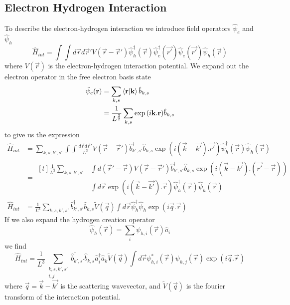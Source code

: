 \subsection{Electron Hydrogen Interaction}
To describe the electron-hydrogen
interaction we introduce field
operators \(\hat{\psi}_e\) and
\(\hat{\psi}_h\)~\cite{nazarov_danon_2013}
\begin{equation}
    \hat{H}_{int} = \int\int{d\vec{r} d\vec{r}'
        V(\vec{r}-\vec{r}')
        \hat{\psi}^\dagger_h(\vec{r})
        \hat{\psi}^\dagger_e(\vec{r'})
        \hat{\psi}_e(\vec{r'})
        \hat{\psi}_h(\vec{r})}
\end{equation}
where \(V(\vec{r})\) is
the electron-hydrogen
interaction potential.
We expand out the
electron operator in
the free electron basis state
\begin{align}
    \hat{\psi}_e(\mathbf{r}) & = \sum_{k, s}
    \braket{\mathbf{r}|\mathbf{k}}
    \hat{b}_{k, s}                                      \\
                          & = \frac{1}{L^{\frac{3}{2}}}
    \sum_{k, s} \exp{(i\mathbf{k}.\mathbf{r})}
    \hat{b}_{k, s}
\end{align}
to give us the expression
\begin{align}
    \hat{H}_{int} & =
    \sum_{k, s, k', s'} \int\int{\frac{d\vec{r} d\vec{r}'}{L^3}
        V(\vec{r}-\vec{r}')
        \hat{b}^\dagger_{k',s'}
        \hat{b}_{k, s}
        \exp{(i(\vec{k} - \vec{k'}).\vec{r'})}
        \hat{\psi}^\dagger_h(\vec{r})
    \hat{\psi}_h(\vec{r})}                       \\
                  & = \begin{aligned}[t]
        \frac{1}{L^3}
        \sum_{k, s, k', s'}
         & \int d(\vec{r}' - \vec{r})
        V(\vec{r}-\vec{r}')
        \hat{b}^\dagger_{k',s'}
        \hat{b}_{k, s}
        \exp{(i(\vec{k} - \vec{k'}).(\vec{r'} - \vec{r}))} \\
         & \int d\vec{r}
        \exp{(i(\vec{k} - \vec{k'}).\vec{r})}
        \hat{\psi}^\dagger_h(\vec{r})
        \hat{\psi}_h(\vec{r})
    \end{aligned} \\
    \hat{H}_{int} & = \frac{1}{L^3}
    \sum_{k,s,k',s'}
    \hat{b}^\dagger_{k',s'}\hat{b}_{k,s}
    \tilde{V}(\vec{q})\int{d\vec{r}
    \hat{\psi}_h^{\dagger}\hat{\psi}_h
    \exp(i\vec{q}.\vec{r})}
\end{align}
If we also expand the
hydrogen creation operator
\begin{equation}
    \hat{\psi}_h(\vec{r}) =
    \sum_{i} \psi_{h,i}(\vec{r})
    \hat{a}_i
\end{equation}
we find
\begin{equation}
    \hat{H}_{int} = \frac{1}{L^3}
    \sum_{\substack{ k,s,k',s'\\ i,j}}
    \hat{b}^\dagger_{k',s'}\hat{b}_{k,s}
    \hat{a}^\dagger_i \hat{a}_k
    \tilde{V}(\vec{q})\int{d\vec{r}
        \psi^*_{h,i}(\vec{r})\psi_{h,j}(\vec{r})
        \exp(i\vec{q}.\vec{r})}\label{eqn:interaction hamiltonian expanded}
\end{equation}
where \(\vec{q} = \vec{k} - \vec{k'}\)
is the scattering wavevector, and
\(\tilde{V}(\vec{q})\) is the
fourier transform of the interaction
potential.


